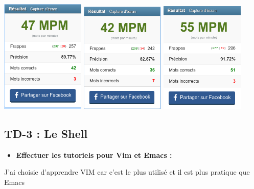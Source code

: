 \documentclass[12pt]{article}
\begin{document}
\thispagestyle{empty}
\begin{center}
  \includegraphics[width=4cm]{screen-resultat-1.png}\hfill
  \includegraphics[width=4cm]{screen-resultat-2.png}\hfill
  \includegraphics[width=4cm]{screen-resultat-3.png}
\end{center}
\vspace{0.3cm}

	\subsection{TD-3 : Le Shell}
  \vspace{0.3cm}

\begin{itemize}
  \item \textbf{Effectuer les tutoriels pour Vim et Emacs :}
\end{itemize}
\vspace{0.3cm}

J'ai choisie d'apprendre VIM car c'est le plus utilisé et il est plus pratique que Emacs
\end{document}
